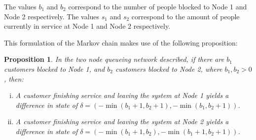 \documentclass{article}
\newtheorem{proposition}{Proposition}
\begin{document}
\begin{center}
\end{center}

The values $b_1$ and $b_2$ correspond to the number of people blocked to Node 1 and Node 2 respectively.
The values $s_1$ and $s_2$ correspond to the amount of people currently in service at Node 1 and Node 2 respectively.

This formulation of the Markov chain makes use of the following proposition:\\

\begin{proposition}
  In the two node queueing network described, if there are $b_1$ customers blocked to Node 1, and $b_2$ customers blocked to Node 2, where $b_1, b_2 > 0$, then:
  \begin{enumerate}[i.]
    \item \label{itm:exit1} A customer finishing service and leaving the system at Node 1 yields a difference in state of $\delta = (-\min(b_1+1, b_2+1), -\min(b_1, b_2+1))$.
    \item \label{itm:exit2} A customer finishing service and leaving the system at Node 2 yields a difference in state of $\delta = (-\min(b_1+1, b_2), -\min(b_1+1, b_2+1))$.
  \end{enumerate}
\end{proposition}
\end{document}
